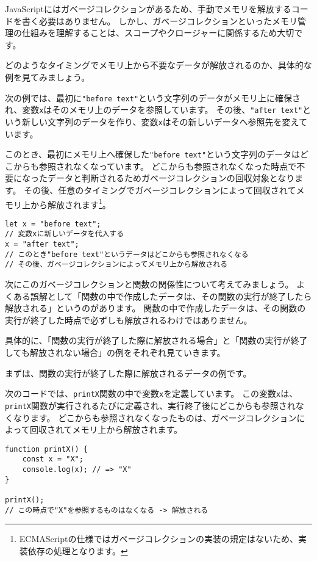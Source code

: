 JavaScriptにはガベージコレクションがあるため、手動でメモリを解放するコードを書く必要はありません。
しかし、ガベージコレクションといったメモリ管理の仕組みを理解することは、スコープやクロージャーに関係するため大切です。

どのようなタイミングでメモリ上から不要なデータが解放されるのか、具体的な例を見てみましょう。

次の例では、最初に\texttt{"before text"}という文字列のデータがメモリ上に確保され、変数\texttt{x}はそのメモリ上のデータを参照しています。
その後、\texttt{"after text"}という新しい文字列のデータを作り、変数\texttt{x}はその新しいデータへ参照先を変えています。

このとき、最初にメモリ上へ確保した\texttt{"before text"}という文字列のデータはどこからも参照されなくなっています。
どこからも参照されなくなった時点で不要になったデータと判断されるためガベージコレクションの回収対象となります。
その後、任意のタイミングでガベージコレクションによって回収されてメモリ上から解放されます\footnote{ECMAScriptの仕様ではガベージコレクションの実装の規定はないため、実装依存の処理となります。}。

\begin{lstlisting}
let x = "before text";
// 変数xに新しいデータを代入する
x = "after text";
// このとき"before text"というデータはどこからも参照されなくなる
// その後、ガベージコレクションによってメモリ上から解放される
\end{lstlisting}

次にこのガベージコレクションと関数の関係性について考えてみましょう。
よくある誤解として「関数の中で作成したデータは、その関数の実行が終了したら解放される」というのがあります。
関数の中で作成したデータは、その関数の実行が終了した時点で必ずしも解放されるわけではありません。

具体的に、「関数の実行が終了した際に解放される場合」と「関数の実行が終了しても解放されない場合」の例をそれぞれ見ていきます。

まずは、関数の実行が終了した際に解放されるデータの例です。

次のコードでは、\texttt{printX}関数の中で変数\texttt{x}を定義しています。
この変数\texttt{x}は、\texttt{printX}関数が実行されるたびに定義され、実行終了後にどこからも参照されなくなります。
どこからも参照されなくなったものは、ガベージコレクションによって回収されてメモリ上から解放されます。

\begin{lstlisting}
function printX() {
    const x = "X";
    console.log(x); // => "X"
}

printX();
// この時点で"X"を参照するものはなくなる -> 解放される
\end{lstlisting}

